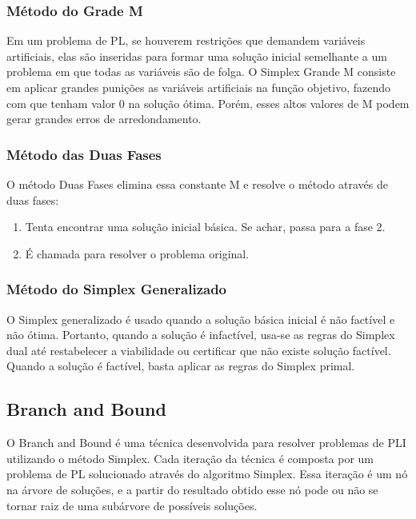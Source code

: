 \documentclass [11pt]{articleSBPO}
\begin{document}
\subsubsection{Método do Grade M}\label{subsubsec:grandem}

Em um problema de PL, se houverem restrições que demandem variáveis artificiais, elas são inseridas para formar uma solução inicial semelhante a um problema em que todas as variáveis são de folga. O Simplex Grande M consiste em aplicar grandes punições as variáveis artificiais na função objetivo, fazendo com que tenham valor 0 na solução ótima.
Porém, esses altos valores de M podem gerar grandes erros de arredondamento. 

\subsubsection{Método das Duas Fases}\label{subsubsec:duasfases}

O método Duas Fases elimina essa constante M e resolve o método através de duas fases:

\begin{enumerate}
	\item Tenta encontrar uma solução inicial básica. Se achar, passa para a fase 2.
	\item É chamada para resolver o problema original.
\end{enumerate}

\subsubsection{Método do Simplex Generalizado}\label{subsubsec:generalizado}

O Simplex generalizado é usado quando a solução básica inicial é não factível e não ótima. Portanto, quando a solução é infactível, usa-se as regras do Simplex dual até restabelecer a viabilidade ou certificar que não existe solução factível. Quando a solução é factível, basta aplicar as regras do Simplex primal.

\subsection{Branch and Bound}\label{subsec:bnb}

O Branch and Bound é uma técnica desenvolvida para resolver problemas de PLI utilizando o método Simplex. Cada iteração da técnica é composta por um problema de PL solucionado através do algoritmo Simplex. Essa iteração é um nó na árvore de soluções, e a partir do resultado obtido esse nó pode ou não se tornar raiz de uma subárvore de possíveis soluções.
\end{document}
